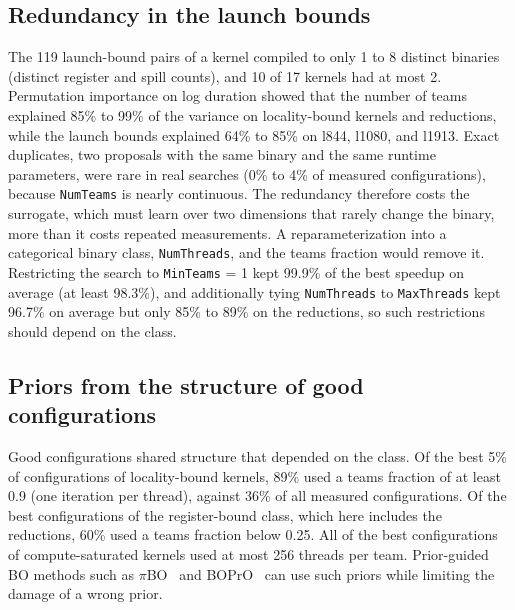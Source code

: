 \documentclass[10pt]{article}
\newcommand{\code}[1]{\texttt{#1}}
\begin{document}
\subsection{Redundancy in the launch bounds}
The 119 launch-bound pairs of a kernel compiled to only 1 to 8 distinct
binaries (distinct register and spill counts), and 10 of 17 kernels had at
most 2. Permutation importance on log duration showed that the number of teams
explained 85\% to 99\% of the variance on locality-bound kernels and
reductions, while the launch bounds explained 64\% to 85\% on l844, l1080,
and l1913. Exact duplicates, two proposals with the same binary and the same
runtime parameters, were rare in real searches (0\% to 4\% of measured
configurations), because \code{NumTeams} is nearly continuous. The redundancy
therefore costs the surrogate, which must learn over two dimensions that
rarely change the binary, more than it costs repeated measurements. A
reparameterization into a categorical binary class, \code{NumThreads}, and
the teams fraction would remove it. Restricting the search to
\code{MinTeams} = 1 kept 99.9\% of the best speedup on average (at least
98.3\%), and additionally tying \code{NumThreads} to \code{MaxThreads} kept
96.7\% on average but only 85\% to 89\% on the reductions, so such
restrictions should depend on the class.

\subsection{Priors from the structure of good configurations}
Good configurations shared structure that depended on the class. Of the best
5\% of configurations of locality-bound kernels, 89\% used a teams fraction of
at least 0.9 (one iteration per thread), against 36\% of all measured
configurations. Of the best configurations of the register-bound class, which
here includes the reductions, 60\% used a teams fraction below 0.25. All of
the best configurations of compute-saturated kernels used at most 256 threads
per team. Prior-guided BO methods such as $\pi$BO~\cite{hvarfner2022pibo} and
BOPrO~\cite{souza2021bopro} can use such priors while limiting the damage of
a wrong prior.
\end{document}
